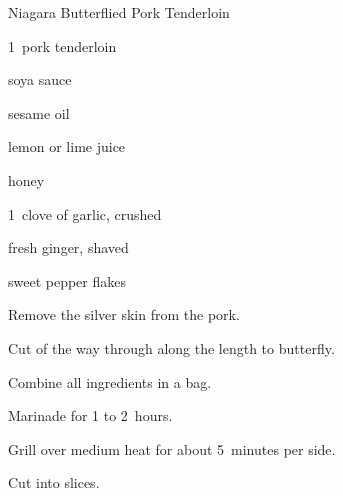 \begin{recipe}{Niagara Butterflied Pork Tenderloin}{}{}

\begin{ingredients}
\item 1~pork tenderloin
\item \C{\quarter} soya sauce
\item {} sesame oil
\item {} lemon or lime juice
\item {} honey
\item 1~clove of garlic, crushed
\item {} fresh ginger, shaved
\item {} sweet pepper flakes
\end{ingredients}

\begin{directions}
\item Remove the silver skin from the pork.
\item Cut \threequarter{} of the way through along the length to butterfly.
\item Combine all ingredients in a bag.
\item Marinade for 1 to 2~hours.
\item Grill over medium heat for about 5~minutes per side.
\item Cut into slices.
\end{directions}

\end{recipe}
